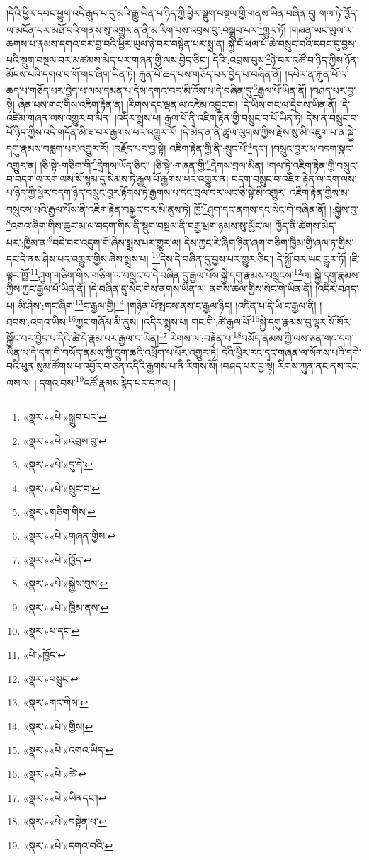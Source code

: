 །དེའི་ཕྱིར་དབང་ཕྱུག་འདི་རྒུད་པ་དུ་མའི་རྒྱུ་ཡིན་པ་ཉིད་ཀྱི་ཕྱིར་སྡུག་བསྔལ་གྱི་གནས་ཡིན་བཞིན་དུ། གལ་ཏེ་ཁྱོད་ལ་མངོན་པར་མཐོ་བའི་གནས་སུ་འགྱུར་ན་ནི་མ་རིག་པས་འབྲས་བུ་:བསྒྲུབ་པར་\footnote{«སྣར་»«པེ་»སྒྲུབ་པར་}གྱུར་ཏོ། །གཞན་ཡང་ཡུལ་ལ་ཆགས་པ་རྣམས་དགའ་བར་བྱ་བའི་ཕྱིར་ཡུལ་ཉེ་བར་བསྟེན་པར་སྨྲ་ན། སྐྱེ་བོ་ཕལ་པོ་ཆེ་བསྲུང་བའི་དབང་དུ་བྱས་པའི་སྡུག་བསྔལ་བར་མཚམས་མེད་པར་གཞན་གྱི་ལས་བྱེད་ཅིང་། དེའི་:འབྲས་བུས་\footnote{«སྣར་»«པེ་»འབྲས་བུ་}ཉེ་བར་འཚོ་བ་ཉིད་ཀྱིས་ཉོན་མོངས་པའི་དགའ་བ་གོ་གང་ཞིག་ཡིན་ཏེ། རྐུན་པོ་ཆད་པས་གཅོད་པར་བྱེད་པ་བཞིན་ནོ། །དཔེར་ན་རྐུན་པོ་ལ་ཆད་པ་གཅོད་པར་བྱེད་པ་ལས་དམན་པ་དེས་དགའ་བར་མི་འོས་པ་དེ་བཞིན་དུ་\footnote{«སྣར་»«པེ་»དུ་དེ་}རྒྱལ་པོ་ཡིན་ནོ། །བཤད་པར་བྱ་སྟེ། ཞེན་པས་གང་གིས་འཇིག་རྟེན་ན། །རིགས་དང་ལྡན་ལ་འཛེམ་འབྱུང་བ། །དེ་ཡིས་གང་ལ་དྲེགས་ཡིན་ནོ། །དེ་འཛེམ་གཞན་ལས་འགྱུར་བ་མིན། །འདིར་སྨྲས་པ། རྒྱལ་པོ་ནི་འཇིག་རྟེན་གྱི་བསྲུང་བ་པོ་ཡིན་ཏེ། དེས་ན་བསྲུང་བ་པོ་ཉིད་ཀྱིས་འདི་གདོན་མི་ཟ་བར་རྒྱགས་པར་འགྱུར་རོ། །དེ་མེད་ན་ནི་ཚུལ་ལུགས་ཀྱིས་རྗེས་སུ་མི་འཇུག་པ་ན་སྐྱེ་དགུ་རྣམས་བརླག་པར་འགྱུར་རོ། །བརྗོད་པར་བྱ་སྟེ། འཇིག་རྟེན་གྱི་ནི་:སྲུང་པོ་\footnote{«སྣར་»«པེ་»སྲུང་བ་}དང་། །བསྲུང་བྱར་ས་བདག་སྣང་འགྱུར་ན། །ཅི་སྟེ་:གཅིག་གི་\footnote{«སྣར་»གཅིག་གིས་}དྲེགས་ཡོད་ཅིང་། །ཅི་སྟེ་:གཞན་གྱི་\footnote{«སྣར་»«པེ་»གཞན་གྱིས་}དྲེགས་བྲལ་མིན། །གལ་ཏེ་འཇིག་རྟེན་གྱི་བསྲུང་བ་བདག་ལ་རག་ལས་སོ་སྙམ་དུ་སེམས་ཏེ་རྒྱལ་པོ་རྒྱགས་པར་འགྱུར་ན། བདག་བསྲུང་བ་འཇིག་རྟེན་ལ་རག་ལས་པ་ཉིད་ཀྱི་ཕྱིར་བདག་ཉིད་བསྲུང་བྱར་རྟོགས་ཏེ་རྒྱགས་པ་དང་བྲལ་བར་ཡང་ཅི་སྟེ་མི་འགྱུར། འཇིག་རྟེན་གྱིས་མ་བསྲུངས་པའི་རྒྱལ་པོས་ནི་འཇིག་རྟེན་བསྐྱང་བར་མི་ནུས་ཏེ། ཁྱོ་\footnote{«སྣར་»«པེ་»ཁྱོད་}ཤུག་དང་ནགས་དང་སེང་གེ་བཞིན་ནོ། །:སྐྱེས་བུ་\footnote{«སྣར་»«པེ་»སྐྱེས་བུས་}འགའ་ཞིག་གིས་ཆུང་མ་ལ་བདག་གིས་ནི་སྡུག་བསྔལ་ནི་བརྒྱ་ཕྲག་ཉམས་སུ་མྱོང་ལ། ཁྱོད་ནི་ཚེགས་མེད་པར་:ཁྱིམ་ན་\footnote{«སྣར་»«པེ་»ཁྱིམ་ནས་}བདེ་བར་འདུག་གོ་ཞེས་སྨྲས་པར་གྱུར་ལ། དེས་ཀྱང་རེ་ཞིག་ཉིན་ཞག་གཅིག་ཁྱིམ་གྱི་ཞལ་ཏ་གྱིས་དང་དེ་ནས་ཤེས་པར་འགྱུར་གྱིས་ཞེས་སྨྲས་པ། \footnote{«སྣར་»པ་དང་}དེས་དེ་བཞིན་དུ་བྱས་པར་གྱུར་ཅིང་། དེ་སྐྱོ་བར་ཡང་གྱུར་ཏོ། །ཇི་ལྟར་ཁྱོ་\footnote{«པེ་»ཁྱོད་}ཤུག་གཅིག་གིས་གཅིག་ལ་བསྲུང་བ་དེ་བཞིན་དུ་རྒྱལ་པོས་སྐྱེ་དགུ་རྣམས་བསྲུངས་\footnote{«སྣར་»བསྲུང་}ལ། སྐྱེ་དགུ་རྣམས་ཀྱིས་ཀྱང་རྒྱལ་པོ་ཡིན་ནོ། །དེ་བཞིན་དུ་སེང་གེས་ནགས་ཡིན་ལ། ནགས་ཚལ་གྱིས་སེང་གེ་ཡིན་ནོ། །འདིར་བཤད་པ། མི་ཤེས་:གང་ཞིག་\footnote{«སྣར་»གང་གིས་}ང་རྒྱལ་གྱི།\footnote{«སྣར་»«པེ་»གྱིས།} །གཉེན་པོ་སྤངས་ནས་ང་རྒྱལ་ཉིད། །འཛིན་པ་དེ་ཡི་ང་རྒྱལ་ནི། །ཐབས་:འགའ་ཡིས་\footnote{«སྣར་»«པེ་»འགའ་ཡིད་}ཀྱང་གཞོམ་མི་ནུས། །འདིར་སྨྲས་པ། གང་གི་:ཚེ་རྒྱལ་པོ་\footnote{«སྣར་»«པེ་»ཚེ་}སྐྱེ་དགུ་རྣམས་བུ་ལྟར་སོ་སོར་སྐྱོང་བར་བྱེད་པ་དེའི་ཚེ་དེ་རྣམ་པར་རྒྱལ་བ་ཡིན།\footnote{«སྣར་»«པེ་»ཡིནདང་།} རིགས་ལ་:བརྟེན་པ་\footnote{«སྣར་»«པེ་»བསྟེན་པ་}བསོད་ནམས་ཀྱི་ལས་ཅན་གང་དག་ཡིན་པ་དེ་དག་གི་བསོད་ནམས་ཀྱི་དྲུག་ཆའི་འཕྲོག་པ་པོར་འགྱུར་ཏེ། དེའི་ཕྱིར་རང་དང་གཞན་ལ་སོགས་པའི་དགེ་བའི་ཕུན་སུམ་ཚོགས་པ་འབྱོར་བ་ཅན་འདིའི་རྒྱགས་པ་ནི་རིགས་སོ། །བཤད་པར་བྱ་སྟེ། རིགས་ཀུན་ནང་ནས་རང་ལས་ལ། །:དགའ་བས་\footnote{«སྣར་»«པེ་»དགའ་བའི་}འཚོ་རྣམས་རྙེད་པར་དཀའ། །
